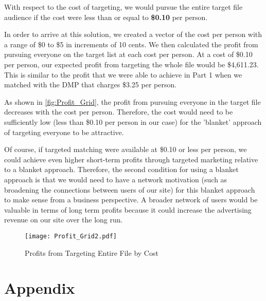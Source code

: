 With respect to the cost of targeting, we would pursue the entire target file audience if the cost were less than or equal to \textbf{\$0.10} per person.

In order to arrive at this solution, we created a vector of the cost per person with a range of \$0 to \$5 in increments of 10 cents. We then calculated the profit from pursuing everyone on the target list at each cost per person. At a cost of \$0.10 per person, our expected profit from targeting the whole file would be \$4,611.23. This is similar to the profit that we were able to achieve in Part 1 when we matched with the DMP that charges \$3.25 per person.

As shown in \vref{fig:Profit_Grid}, the profit from pursuing everyone in the target file decreases with the cost per person. Therefore, the cost would need to be sufficiently low (less than \$0.10 per person in our case) for the 'blanket' approach of targeting everyone to be attractive.

Of course, if targeted matching were available at \$0.10 or less per person, we could achieve even higher short-term profits through targeted marketing relative to a blanket approach. Therefore, the second condition for using a blanket approach is that we would need to have a network motivation (such as broadening the connections between users of our site) for this blanket approach to make sense from a business perspective. A broader network of users would be valuable in terms of long term profits because it could increase the advertising revenue on our site over the long run.

\begin{figure}[!htb]
  \centering
  \caption{Profits from Targeting Entire File by Cost}
  \texttt{[image: Profit\_Grid2.pdf]}
  \label{fig:Profit_Grid}
\end{figure}

\clearpage
\section{Appendix} \label{sec:appendix}




% 


